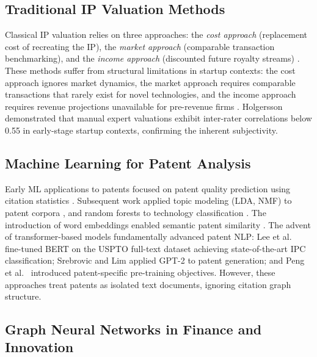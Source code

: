 \documentclass[journal]{IEEEtran}
\begin{document}
\subsection{Traditional IP Valuation Methods}

Classical IP valuation relies on three approaches: the \textit{cost approach} (replacement cost of recreating the IP), the \textit{market approach} (comparable transaction benchmarking), and the \textit{income approach} (discounted future royalty streams) \cite{smith1994intellectual, wipo2020guidelines}. These methods suffer from structural limitations in startup contexts: the cost approach ignores market dynamics, the market approach requires comparable transactions that rarely exist for novel technologies, and the income approach requires revenue projections unavailable for pre-revenue firms \cite{razgaitis2003valuation}. Holgersson \cite{holgersson2013patent} demonstrated that manual expert valuations exhibit inter-rater correlations below 0.55 in early-stage startup contexts, confirming the inherent subjectivity.

\subsection{Machine Learning for Patent Analysis}

Early ML applications to patents focused on patent quality prediction using citation statistics \cite{hall2005market, lanjouw1998quality}. Subsequent work applied topic modeling (LDA, NMF) to patent corpora \cite{lee2009topic}, and random forests to technology classification \cite{grawe2012patent}. The introduction of word embeddings enabled semantic patent similarity \cite{helmers2019measuring}. The advent of transformer-based models fundamentally advanced patent NLP: Lee et al.~\cite{lee2020patentbert} fine-tuned BERT on the USPTO full-text dataset achieving state-of-the-art IPC classification; Srebrovic and Lim \cite{srebrovic2020leveraging} applied GPT-2 to patent generation; and Peng et al.~\cite{peng2022patent} introduced patent-specific pre-training objectives. However, these approaches treat patents as isolated text documents, ignoring citation graph structure.

\subsection{Graph Neural Networks in Finance and Innovation}
\end{document}

